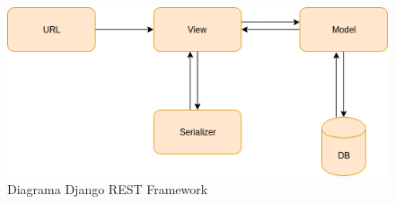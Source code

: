 \begin{figure}[H]
	\centering
	\includegraphics[width=1.0\textwidth]{figuras/django_rest.png}
	\caption{Diagrama Django REST Framework}
	\label{img:diagrama_rest}
\end{figure}
